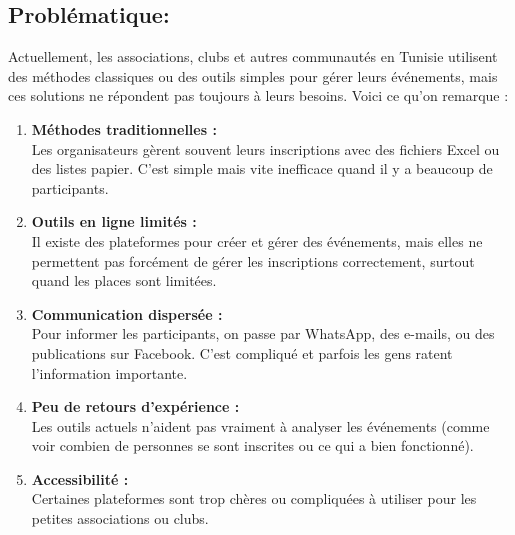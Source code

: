 \subsection{Problématique:}
Actuellement, les associations, clubs et autres communautés en Tunisie utilisent des méthodes classiques ou des outils simples pour gérer leurs événements, mais ces solutions ne répondent pas toujours à leurs besoins. Voici ce qu’on remarque :
\begin{enumerate}
    \item \textbf{Méthodes traditionnelles :} \\
    Les organisateurs gèrent souvent leurs inscriptions avec des fichiers Excel ou des listes papier. C’est simple mais vite inefficace quand il y a beaucoup de participants.
    \item \textbf{Outils en ligne limités :} \\
    Il existe des plateformes pour créer et gérer des événements, mais elles ne permettent pas forcément de gérer les inscriptions correctement, surtout quand les places sont limitées.
    \item \textbf{Communication dispersée :} \\
    Pour informer les participants, on passe par WhatsApp, des e-mails, ou des publications sur Facebook. C’est compliqué et parfois les gens ratent l’information importante.
    \item \textbf{Peu de retours d’expérience :} \\
    Les outils actuels n’aident pas vraiment à analyser les événements (comme voir combien de personnes se sont inscrites ou ce qui a bien fonctionné).
    \item \textbf{Accessibilité :}  \\
    Certaines plateformes sont trop chères ou compliquées à utiliser pour les petites associations ou clubs.
\end{enumerate}
